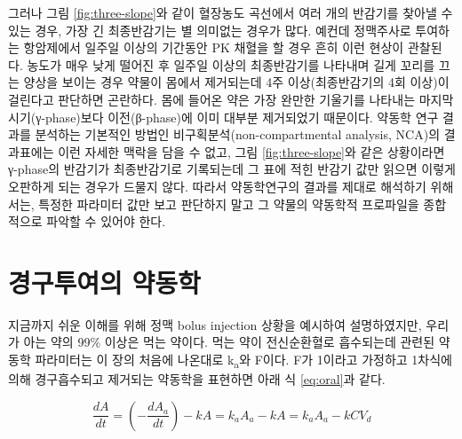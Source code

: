 \documentclass[
  11pt,
  krantz2, a4paper, twoside]{krantz}
\theoremstyle{definition}
\theoremstyle{definition}
\theoremstyle{definition}
\theoremstyle{definition}
\theoremstyle{remark}
\begin{document}
그러나 그림 \ref{fig:three-slope}와 같이 혈장농도 곡선에서 여러 개의 반감기를 찾아낼 수 있는 경우, 가장 긴 최종반감기는 별 의미없는 경우가 많다. 
예컨데 정맥주사로 투여하는 항암제에서 일주일 이상의 기간동안 PK 채혈을 할 경우 흔히 이런 현상이 관찰된다.
농도가 매우 낮게 떨어진 후 일주일 이상의 최종반감기를 나타내며 길게 꼬리를 끄는 양상을 보이는 경우 약물이 몸에서 제거되는데 4주 이상(최종반감기의 4회 이상)이 걸린다고 판단하면 곤란하다. 
몸에 들어온 약은 가장 완만한 기울기를 나타내는 마지막 시기(γ-phase)보다 이전(β-phase)에 이미 대부분 제거되었기 때문이다.
약동학 연구 결과를 분석하는 기본적인 방법인 비구획분석(non-compartmental analysis, NCA)의 결과표에는 이런 자세한 맥락을 담을 수 없고, 그림 \ref{fig:three-slope}와 같은 상황이라면 γ-phase의 반감기가 최종반감기로 기록되는데 그 표에 적힌 반감기 값만 읽으면 이렇게 오판하게 되는 경우가 드물지 않다. 
따라서 약동학연구의 결과를 제대로 해석하기 위해서는, 특정한 파라미터 값만 보고 판단하지 말고 그 약물의 약동학적 프로파일을 종합적으로 파악할 수 있어야 한다.

\section{\texorpdfstring{경구투여의 약동학}{경구투여의 약동학}}\label{uxacbduxad6cuxd22cuxc5ecuxc758-uxc57duxb3d9uxd559}

지금까지 쉬운 이해를 위해 정맥 bolus injection 상황을 예시하여 설명하였지만, 우리가 아는 약의 99\% 이상은 먹는 약이다.
먹는 약이 전신순환혈로 흡수되는데 관련된 약동학 파라미터는 이 장의 처음에 나온대로 k\textsubscript{a}와 F이다. 
F가 1이라고 가정하고 1차식에 의해 경구흡수되고 제거되는 약동학을 표현하면 아래 식 \eqref{eq:oral}과 같다.

\begin{equation}
\frac{{dA}}{{dt}} = \left( - \frac{{dA}_{a}}{{dt}} \right) - kA = k_{a}A_{a} - kA = k_{a}A_{a} - kCV_{d}
\label{eq:oral}
\end{equation}
\end{document}
